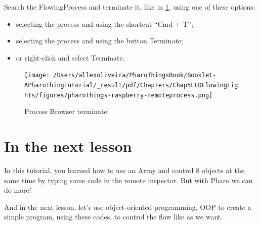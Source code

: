 \documentclass[10pt,twoside,english]{_support/latex/sbabook/sbabook}
\begin{document}
Search the FlowingProcess and terminate it, like in \ref{Process8LEDs}, using one of these options:

\begin{itemize}
\item selecting the process and using the shortcut “Cmd + T”;
\item selecting the process and using the button Terminate;
\item or right-click and select Terminate.
\end{itemize}


\begin{figure}

\begin{center}
\texttt{[image: /Users/allexoliveira/PharoThingsBook/Booklet-APharoThingTutorial/\_result/pdf/Chapters/Chap5LEDFlowingLights/figures/pharothings-raspberry-remoteprocess.png]}\caption{Process Browser terminate.\label{Process8LEDs}}\end{center}
\end{figure}

\section{In the next lesson}
In this tutorial, you learned how to use an Array and control 8 objects at the same time by typing some code in the remote inspector. But with Pharo we can do more!

And in the next lesson, let’s use object-oriented programming, OOP to create a simple program, using these codes, to control the flow like as we want.


\backmatter

\end{document}
